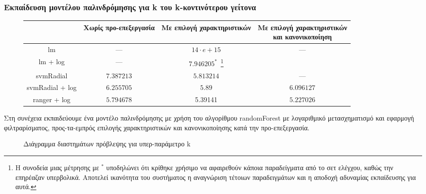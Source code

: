 \subsubsection{Εκπαίδευση μοντέλου παλινδρόμησης για k του k-κοντινότερου γείτονα} \label{section:HPPk}
\begin{figure}[!htb]
	\footnotesize
	\begin{center}
		\begin{tabular}{ |c|c|c|c| } 
			\hline
			& Χωρίς προ-επεξεργασία & Με επιλογή χαρακτηριστικών & \pbox{20cm}{Με επιλογή χαρακτηριστικών\\ και κανονικοποίηση} \\
			\hline
			lm & --- & $14 \cdot e+15$ &  --- \\
			\hline
			lm + log & --- & $7.946205 ^{*}$~\footnote{Η συνοδεία μιας μέτρησης με $^*$ υποδηλώνει ότι κρίθηκε χρήσιμο να αφαιρεθούν κάποια παραδείγματα από το σετ ελέγχου, καθώς την επηρέαζαν υπερβολικά. Αποτελεί ικανότητα του συστήματος η αναγνώριση τέτοιων παραδειγμάτων και η αποδοχή αδυναμίας εκπαίδευσης για αυτά. }& \\
			\hline
			svmRadial & $7.387213$ &$5.813214$& --- \\
			\hline
			svmRadial + log& $6.255705$ & $5.89$& $6.096127$\\
			\hline
			ranger + log  & $5.794678$ & 5.39141 & $\bm{5.227026}$\\
			\hline
		\end{tabular}   
	\end{center}
\end{figure}

Στη συνέχεια εκπαιδεύουμε ένα μοντέλο παλινδρόμησης με χρήση του αλγορίθμου randomForest με λογαριθμικό μετασχηματισμό και εφαρμογή φιλτραρίσματος, προς-τα-εμπρός επιλογής χαρακτηριστικών και κανονικοποίησης κατά την προ-επεξεργασία.

\begin{figure}[!htb]
		\scalebox{0.85}{
			}
		\caption[Διάγραμμα διαστημάτων πρόβλεψης για υπερ-παράμετρο k]{Διάγραμμα διαστημάτων πρόβλεψης για υπερ-παράμετρο k}
\end{figure}
\FloatBarrier
